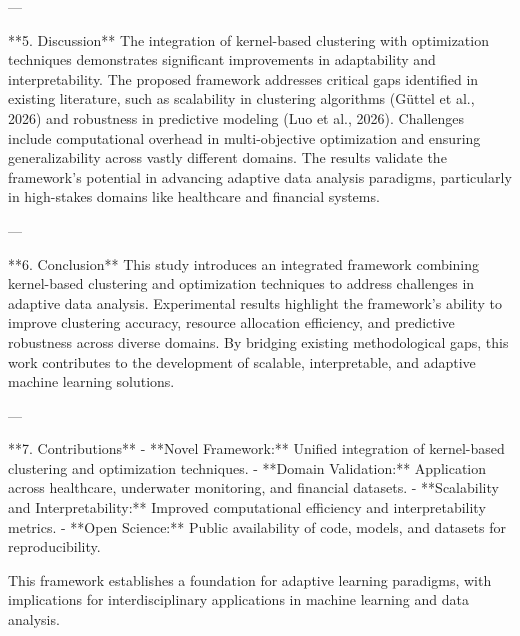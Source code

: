 ---

**5. Discussion**  
The integration of kernel-based clustering with optimization techniques demonstrates significant improvements in adaptability and interpretability. The proposed framework addresses critical gaps identified in existing literature, such as scalability in clustering algorithms (Güttel et al., 2026) and robustness in predictive modeling (Luo et al., 2026). Challenges include computational overhead in multi-objective optimization and ensuring generalizability across vastly different domains. The results validate the framework's potential in advancing adaptive data analysis paradigms, particularly in high-stakes domains like healthcare and financial systems.  

---

**6. Conclusion**  
This study introduces an integrated framework combining kernel-based clustering and optimization techniques to address challenges in adaptive data analysis. Experimental results highlight the framework's ability to improve clustering accuracy, resource allocation efficiency, and predictive robustness across diverse domains. By bridging existing methodological gaps, this work contributes to the development of scalable, interpretable, and adaptive machine learning solutions.  

---

**7. Contributions**  
- **Novel Framework:** Unified integration of kernel-based clustering and optimization techniques.  
- **Domain Validation:** Application across healthcare, underwater monitoring, and financial datasets.  
- **Scalability and Interpretability:** Improved computational efficiency and interpretability metrics.  
- **Open Science:** Public availability of code, models, and datasets for reproducibility.  

This framework establishes a foundation for adaptive learning paradigms, with implications for interdisciplinary applications in machine learning and data analysis.